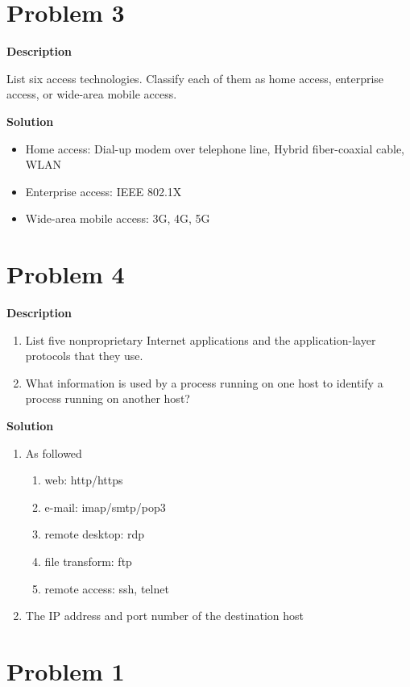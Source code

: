 \documentclass[12pt,letterpaper]{ctexart}
\begin{document}
\section*{Problem 3}

{\bf Description}

List six access technologies. Classify each of them as home access, enterprise access, or wide-area mobile access.

{\bf Solution}

\begin{itemize}
  \item Home access: Dial-up modem over telephone line, Hybrid fiber-coaxial cable, WLAN
  \item Enterprise access: IEEE 802.1X
  \item Wide-area mobile access: 3G, 4G, 5G
\end{itemize}

\section*{Problem 4}
{\bf Description}

\begin{enumerate}
  \item List five nonproprietary Internet applications and the application-layer protocols that they use.
  \item What information is used by a process running on one host to identify a process running on another host?
\end{enumerate}

{\bf Solution}

\begin{enumerate}
  \item As followed
  \begin{enumerate}
    \item  web: http/https
    \item e-mail: imap/smtp/pop3
    \item remote desktop: rdp
    \item file transform: ftp
    \item remote access: ssh, telnet
  \end{enumerate}
  \item The IP address and port number of the destination host
\end{enumerate}

\newpage

\section*{Problem 1}
\end{document}
